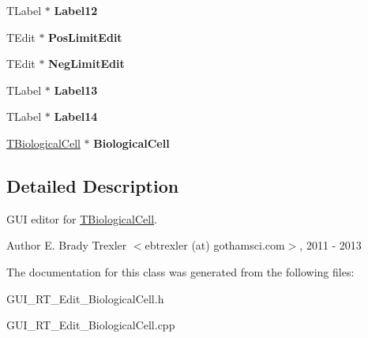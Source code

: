 \begin{DoxyCompactItemize}
\item 
\hypertarget{class_t_biological_cell_form_a4ae380569b7b7885ac5260e613ec3452}{T\+Label $\ast$ {\bfseries Label12}}\label{class_t_biological_cell_form_a4ae380569b7b7885ac5260e613ec3452}

\item 
\hypertarget{class_t_biological_cell_form_adba374de4b673ac141ceea5ac563adc0}{T\+Edit $\ast$ {\bfseries Pos\+Limit\+Edit}}\label{class_t_biological_cell_form_adba374de4b673ac141ceea5ac563adc0}

\item 
\hypertarget{class_t_biological_cell_form_a6643cacc641ee2b4de0c6c5a7b7e9a0b}{T\+Edit $\ast$ {\bfseries Neg\+Limit\+Edit}}\label{class_t_biological_cell_form_a6643cacc641ee2b4de0c6c5a7b7e9a0b}

\item 
\hypertarget{class_t_biological_cell_form_a2e255332b76a7e91fa2a61577d29d19d}{T\+Label $\ast$ {\bfseries Label13}}\label{class_t_biological_cell_form_a2e255332b76a7e91fa2a61577d29d19d}

\item 
\hypertarget{class_t_biological_cell_form_ac17b732fdc51516bf96f960eea1eed0e}{T\+Label $\ast$ {\bfseries Label14}}\label{class_t_biological_cell_form_ac17b732fdc51516bf96f960eea1eed0e}

\item 
\hypertarget{class_t_biological_cell_form_a2ef94b84caa3e94b597ecccac07f6e7b}{\hyperlink{class_t_biological_cell}{T\+Biological\+Cell} $\ast$ {\bfseries Biological\+Cell}}\label{class_t_biological_cell_form_a2ef94b84caa3e94b597ecccac07f6e7b}

\end{DoxyCompactItemize}


\subsection{Detailed Description}
G\+U\+I editor for \hyperlink{class_t_biological_cell}{T\+Biological\+Cell}. 

\begin{DoxyAuthor}{Author}
E. Brady Trexler $<$ebtrexler (at) gothamsci.\+com$>$, 2011 -\/ 2013 
\end{DoxyAuthor}


The documentation for this class was generated from the following files\+:\begin{DoxyCompactItemize}
\item 
G\+U\+I\+\_\+\+R\+T\+\_\+\+Edit\+\_\+\+Biological\+Cell.\+h\item 
G\+U\+I\+\_\+\+R\+T\+\_\+\+Edit\+\_\+\+Biological\+Cell.\+cpp\end{DoxyCompactItemize}
